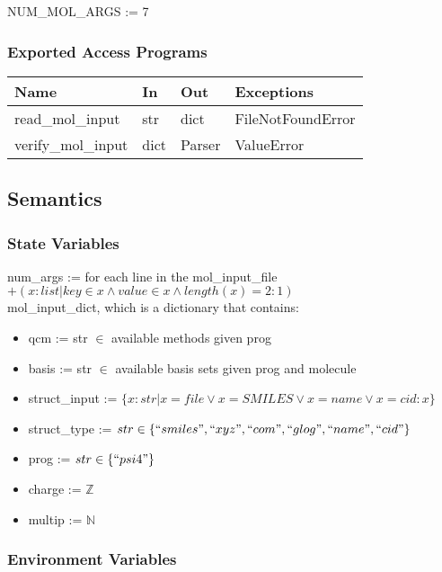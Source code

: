 \documentclass[12pt, titlepage]{article}
\begin{document}
NUM\_MOL\_ARGS := 7

\subsubsection{Exported Access Programs}

\begin{table}[H]
	\begin{tabular}{p{4cm} p{2cm} p{2cm} p{5cm}}
		\toprule
		\textbf{Name} & \textbf{In} & \textbf{Out} & \textbf{Exceptions} \\
		\hline
		read\_mol\_input   & str  & dict & FileNotFoundError \\
		verify\_mol\_input & dict & Parser & ValueError \\
		\bottomrule
	\end{tabular}
\end{table}

\subsection{Semantics}

\subsubsection{State Variables}

\noindent num\_args := for each line in the mol\_input\_file $+(x : list | key 
\in x \land value \in x \land 
length(x) = 2 : 1)$ \\

\noindent mol\_input\_dict, which is a dictionary that contains:
\begin{itemize}
	\item qcm := str $\in$ available methods given prog
	\item basis := str $\in$ available basis sets given prog and molecule
	\item struct\_input := $\{x : str | x = file \lor x = SMILES \lor x = name 
	\lor x = cid : x\}$
	\item struct\_type := $str \in \{``smiles", ``xyz", ``com", ``glog", 
	``name", ``cid"\} $
	\item prog := $str \in \{``psi4"\}$
	\item charge := $\mathbb{Z}$
	\item multip := $\mathbb{N}$
\end{itemize}

\subsubsection{Environment Variables}
\end{document}
